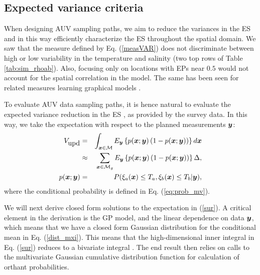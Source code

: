 \documentclass[aoas]{imsart}
\begin{document}
\subsection{Expected variance criteria}

When designing AUV sampling paths, we aim to reduce the variances in the ES and in this way efficiently characterize the ES throughout the spatial domain. We saw that the measure defined by Eq. (\ref{measVAR}) does not discriminate between high or low variability in the temperature and salinity (two top rows of Table \ref{tab:sim_rhoab}).
Also, focusing only on locations with EPs near $0.5$ would not account for the spatial correlation in the model.  
The same has been seen for related measures learning graphical models \citep{lilleborge2016information}.

To evaluate AUV data sampling paths, it is hence natural to evaluate the expected variance reduction in the ES  \citep{chevalier2014fast}, as provided by the survey data. In this way, we take the expectation with respect to the planned measurements ${\boldsymbol y}$:
\begin{eqnarray}\label{sur}
    V_{\mbox{upd}} &=& \int_{\bx \in \mathcal{M}} E_{\by} \left\{ p(\bx;\by)\left( 1-p(\bx;\by)\right) \right\} d\bx \\
    & \approx & \sum_{\bx \in \mathcal{M}_g} E_{\by} \left\{ p(\bx;\by)\left( 1-p(\bx;\by)\right) \right\} \Delta, \nonumber \\
    p(\bx;\by) &=& P(\xi_a(\bx) \leq T_a, \xi_b(\bx) \leq T_b |\by), \nonumber
\end{eqnarray}
where the conditional probability is defined in Eq. (\ref{eq:prob_mv}).

We will next derive closed form solutions to the expectation in (\ref{sur}). A critical
element in the derivation is the GP model, and the linear dependence on data ${\boldsymbol y}$, which means that we have a closed form Gaussian distribution for the conditional mean in Eq. (\ref{dist_mxi}). This means that the high-dimensional inner integral in Eq. (\ref{sur}) reduces to a bivariate integral \citep{bhattacharjya2013value, chevalier2014fast}. The end result then relies on calls to the multivariate Gaussian cumulative distribution function for calculation of orthant probabilities. 
\end{document}
